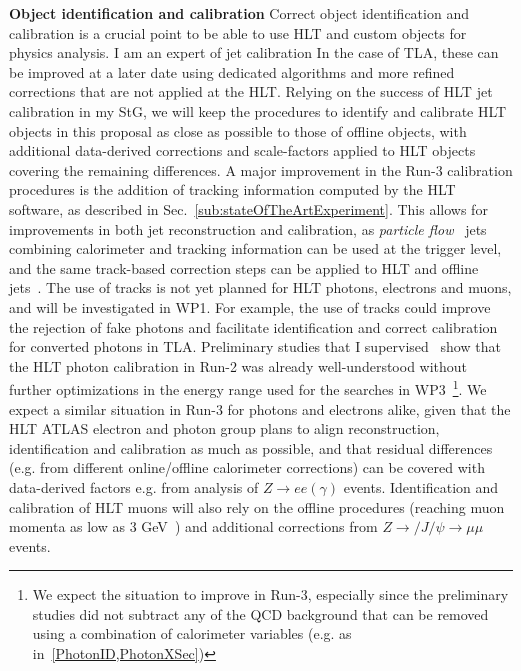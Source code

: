 \textbf{Object identification and calibration} Correct object identification and calibration is a crucial point to be able to use HLT and custom objects for physics analysis.
I am an expert of jet calibration 
In the case of TLA, these can be improved at a later date using dedicated algorithms and more refined corrections that are not applied at the HLT. 
Relying on the success of HLT jet calibration in my StG, we will keep the procedures to identify and calibrate HLT objects in this proposal as close as possible to those of offline objects, with additional data-derived corrections and scale-factors applied to HLT objects covering the remaining differences. 
A major improvement in the Run-3 calibration procedures is the addition of tracking information computed by the HLT software, as described in Sec.~\ref{sub:stateOfTheArtExperiment}. 
This allows for improvements in both jet reconstruction and calibration, as \textit{particle flow}~\cite{ToBeCited} %
jets combining calorimeter and tracking information can be used at the trigger level, and the same track-based correction steps can be applied to HLT and offline jets~\cite{ToBeCited}. %
The use of tracks is not yet planned for HLT photons, electrons and muons, and will be investigated in WP1.   
For example, the use of tracks could improve the rejection of fake photons and facilitate identification and correct calibration for converted photons in TLA.  
Preliminary studies that I supervised~\cite{ToBeCited} %
show that the HLT photon calibration in Run-2 was already well-understood without further optimizations in the energy range used for the searches in WP3~\footnote{We expect the situation to improve in Run-3, especially since the preliminary studies did not subtract any of the QCD background that can be removed using a combination of calorimeter variables (e.g. as in~\ref{PhotonID,PhotonXSec})}. 
We expect a similar situation in Run-3 for photons and electrons alike, given that the HLT ATLAS electron and photon group plans to align reconstruction, identification and calibration as much as possible, and that residual differences (e.g. from different online/offline calorimeter corrections) can be covered with data-derived factors e.g. from analysis of $Z\rightarrow ee (\gamma)$ events.  
Identification and calibration of HLT muons will also rely on the offline procedures (reaching muon momenta as low as 3 GeV~\cite{ToBeCited}) %
and additional corrections from $Z\rightarrow / J/\psi \rightarrow \mu\mu$ events. 

